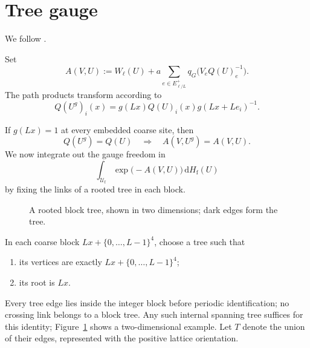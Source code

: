 \documentclass[10pt,reqno]{amsart}
\theoremstyle{definition}
\theoremstyle{remark}
\numberwithin{equation}{section}
\numberwithin{figure}{section}
\newcommand{\dd}{\mathrm d}
\newcommand{\Uf}{\mathcal U_{\mathrm f}}
\newcommand{\Hf}{H_{\mathrm f}}
\begin{document}
\section{Tree gauge}
We follow \cite[Section~11, Lemma~11.2, p.~37]{Exposition}.

Set
\begin{equation}\label{eq:blocking-action}
A(V,U):=W_\ell(U)+a\sum_{e\in E_{\ell/L}^+}q_G\bigl(V_eQ(U)_e^{-1}\bigr).
\end{equation}
The path products transform according to
\begin{equation}\label{eq:display-062}
Q(U^g)_i(x)=g(Lx)Q(U)_i(x)g(Lx+Le_i)^{-1}.
\end{equation}

If $g(Lx)=1$ at every embedded coarse site, then
\begin{equation}\label{eq:display-063}
Q(U^g)=Q(U)
\quad\Longrightarrow\quad
A(V,U^g)=A(V,U).
\end{equation}
We now integrate out the gauge freedom in
\begin{equation}\label{eq:display-064}
\int_{\Uf}\exp\bigl(-A(V,U)\bigr)\,\dd\Hf(U)
\end{equation}
by fixing the links of a rooted tree in each block.

\begin{figure}[htbp]
\centering
{}
\caption{A rooted block tree, shown in two dimensions; dark edges form the tree.}
\label{fig:block-tree}
\end{figure}

In each coarse block $Lx+\{0,\ldots,L-1\}^4$, choose a tree such that
\begin{enumerate}[label=(\roman*)]
\item its vertices are exactly $Lx+\{0,\ldots,L-1\}^4$;
\item its root is $Lx$.
\end{enumerate}
Every tree edge lies inside the integer block before periodic identification;
no crossing link belongs to a block tree. Any such internal spanning tree
suffices for this identity; Figure~\ref{fig:block-tree} shows a two-dimensional example.
Let $T$ denote the union of their edges, represented with the positive lattice orientation.
\end{document}
